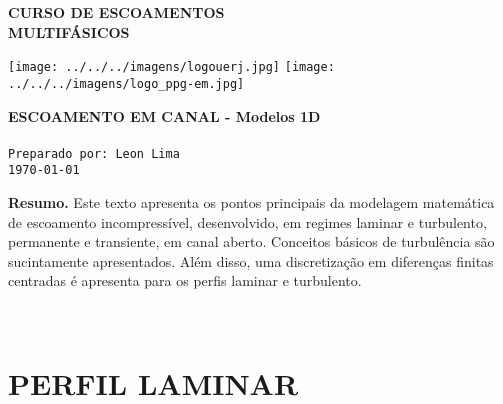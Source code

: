 \documentclass[a4paper,portuguese,10pt]{article}
\begin{document}
\thispagestyle{empty}

\begin{minipage}{0.5\linewidth}
\large\textbf{CURSO DE ESCOAMENTOS\\MULTIFÁSICOS}
\end{minipage}
\begin{minipage}{0.5\linewidth}
\flushright
\texttt{[image: ../../../imagens/logouerj.jpg]}
\hspace{.5cm}
\texttt{[image: ../../../imagens/logo\_ppg-em.jpg]}
\end{minipage}

\hrulefill

\Large \color{NavyBlue} \textbf{ESCOAMENTO EM CANAL - Modelos 1D}\\
\color{Black}\\ %
\normalsize \texttt{Preparado por: Leon Lima}\\%
\normalsize \texttt{\today}


\hrulefill
\begin{center}
\begin{minipage}{0.8\linewidth}
\footnotesize{\textbf{Resumo.} Este texto apresenta os pontos principais da modelagem matemática de escoamento incompressível, desenvolvido, em regimes laminar e turbulento, permanente e transiente, em canal aberto. Conceitos básicos de turbulência são sucintamente apresentados. Além disso, uma discretização em diferenças finitas centradas é apresenta para os perfis laminar e turbulento.}
\end{minipage}
\end{center}

{\footnotesize\tableofcontents}
\hrulefill\\
\onehalfspacing
\vspace{10mm}

\section{PERFIL LAMINAR}
\end{document}
